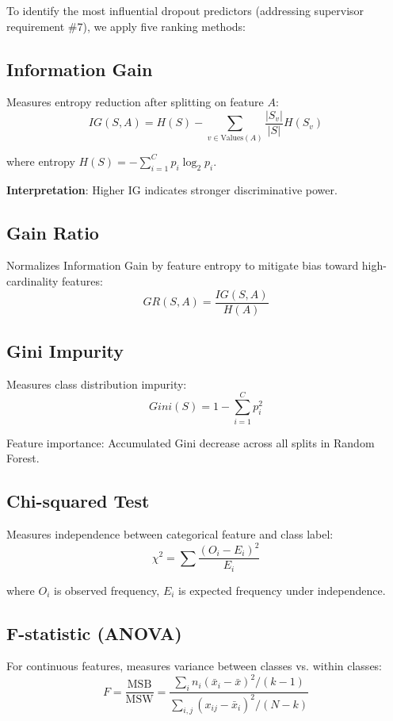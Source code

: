 To identify the most influential dropout predictors (addressing supervisor requirement \#7), we apply five ranking methods:

\subsection{Information Gain}

Measures entropy reduction after splitting on feature $A$:
$$IG(S, A) = H(S) - \sum_{v \in \text{Values}(A)} \frac{|S_v|}{|S|} H(S_v)$$

where entropy $H(S) = -\sum_{i=1}^{C} p_i \log_2 p_i$.

\textbf{Interpretation}: Higher IG indicates stronger discriminative power.

\subsection{Gain Ratio}

Normalizes Information Gain by feature entropy to mitigate bias toward high-cardinality features:
$$GR(S, A) = \frac{IG(S, A)}{H(A)}$$

\subsection{Gini Impurity}

Measures class distribution impurity:
$$Gini(S) = 1 - \sum_{i=1}^{C} p_i^2$$

Feature importance: Accumulated Gini decrease across all splits in Random Forest.

\subsection{Chi-squared Test}

Measures independence between categorical feature and class label:
$$\chi^2 = \sum \frac{(O_i - E_i)^2}{E_i}$$

where $O_i$ is observed frequency, $E_i$ is expected frequency under independence.

\subsection{F-statistic (ANOVA)}

For continuous features, measures variance between classes vs. within classes:
$$F = \frac{\text{MSB}}{\text{MSW}} = \frac{\sum_{i} n_i (\bar{x}_i - \bar{x})^2 / (k-1)}{\sum_{i,j} (x_{ij} - \bar{x}_i)^2 / (N-k)}$$

